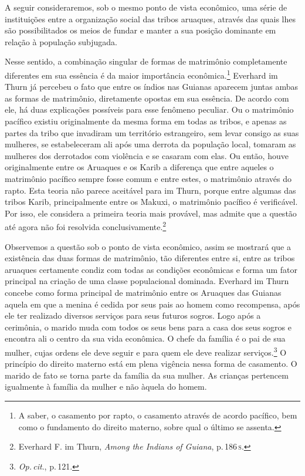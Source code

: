 A seguir consideraremos, sob o mesmo ponto de vista econômico, uma série
de instituições entre a organização social das tribos aruaques, através
das quais lhes são possibilitados os meios de fundar e manter a sua
posição dominante em relação à população subjugada.

Nesse sentido, a combinação singular de formas de matrimônio
completamente diferentes em sua essência é da maior importância
econômica.\footnote{A saber, o casamento por rapto, o casamento através de
acordo pacífico, bem como o fundamento do direito materno, sobre qual o
último se assenta.} Everhard im Thurn já percebeu o fato que entre os
índios nas Guianas aparecem juntas ambas as formas de matrimônio,
diretamente opostas em sua essência. De acordo com ele, há duas
explicações possíveis para esse fenômeno peculiar. Ou o matrimônio
pacífico existiu originalmente da mesma forma em todas as tribos, e
apenas as partes da tribo que invadiram um território estrangeiro, sem
levar consigo as suas mulheres, se estabeleceram ali após uma derrota
da população local, tomaram as mulheres dos derrotados com violência e
se casaram com elas. Ou então, houve originalmente entre os Aruaques e os
Karib a diferença que entre aqueles o matrimônio pacífico sempre fosse
comum e entre estes, o matrimônio através do rapto. Esta teoria não
parece aceitável para im Thurn, porque entre algumas das tribos Karib,
principalmente entre os Makuxi, o matrimônio pacífico é verificável. Por
isso, ele considera a primeira teoria mais provável, mas admite que a
questão até agora não foi resolvida conclusivamente.\footnote{Everhard
  F. im Thurn, \textit{Among the Indians of Guiana}, p.\,186\,\textsc{s}.}

Observemos a questão sob o ponto de vista econômico, assim se mostrará
que a existência das duas formas de matrimônio, tão diferentes entre si,
entre as tribos aruaques certamente condiz com todas as condições
econômicas e forma um fator principal na criação de uma classe
populacional dominada. Everhard im Thurn concebe como forma principal
de matrimônio entre os Aruaques das Guianas aquela em que a menina é
cedida por seus pais ao homem como recompensa, após ele ter realizado
diversos serviços para seus futuros sogros. Logo após a cerimônia, o
marido muda com todos os seus bens para a casa dos seus sogros e
encontra ali o centro da sua vida econômica. O chefe da família é o pai
de sua mulher, cujas ordens ele deve seguir e para quem ele deve
realizar serviços.\footnote{\textit{Op.\,cit}., p.\,121.} O princípio do direito
materno está em plena vigência nessa forma de casamento. O marido de
fato se torna parte da família da sua mulher. As crianças pertencem
igualmente à família da mulher e não àquela do homem.

